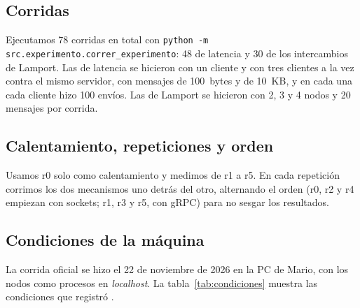 \subsection{Corridas}

Ejecutamos 78 corridas en total con \texttt{python -m src.experimento.correr\_experimento}: 48 de latencia y 30 de los intercambios de Lamport. Las de latencia se hicieron con un cliente y con tres clientes a la vez contra el mismo servidor, con mensajes de 100~bytes y de 10~KB, y en cada una cada cliente hizo 100 envíos. Las de Lamport se hicieron con 2, 3 y 4 nodos y 20 mensajes por corrida.

\subsection{Calentamiento, repeticiones y orden}

Usamos r0 solo como calentamiento y medimos de r1 a r5. En cada repetición corrimos los dos mecanismos uno detrás del otro, alternando el orden (r0, r2 y r4 empiezan con sockets; r1, r3 y r5, con gRPC) para no sesgar los resultados.

\subsection{Condiciones de la máquina}

La corrida oficial se hizo el 22 de noviembre de 2026 en la PC de Mario, con los nodos como procesos en \emph{localhost}. La tabla~\ref{tab:condiciones} muestra las condiciones que registró .

\begin{table}[H]
  \centering
  \caption{Condiciones de la máquina de la corrida oficial}
  \label{tab:condiciones}
  
\end{table}
